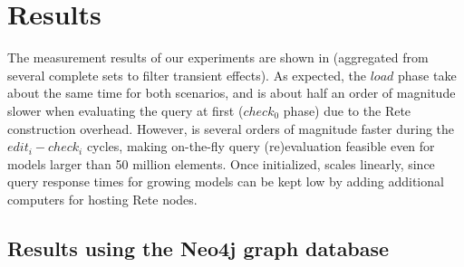 \section{Results}
\label{benchmark_results}\label{analysis}

The measurement results of our experiments are shown in  (aggregated from several complete sets to filter transient effects). As expected, the $\mathit{load}$ phase take about the same time for both scenarios, and \iqd{} is about half an order of magnitude slower when evaluating the query at first ($\mathit{check}_0$ phase) due to the Rete construction overhead. However, \iqd{} is several orders of magnitude faster during the $\mathit{edit}_i-\mathit{check}_i$ cycles, making on-the-fly query (re)evaluation feasible even for models larger than 50 million elements. Once initialized, \iqd{} scales linearly, since query response times for growing models can be kept low by adding additional computers for hosting Rete nodes.










\subsection{Results using the Neo4j graph database}


